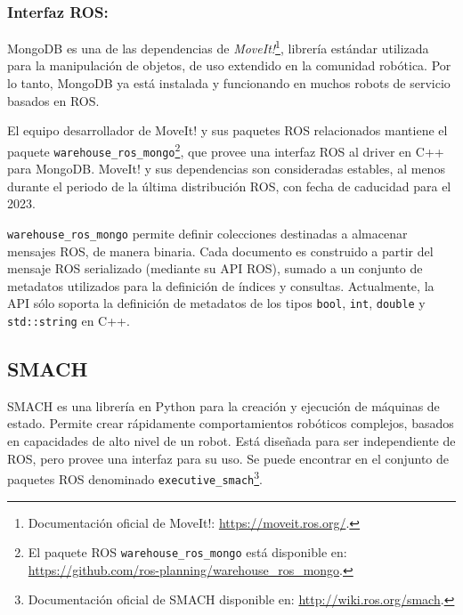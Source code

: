 \subsubsection{Interfaz ROS:}

MongoDB es una de las dependencias de \textit{MoveIt!}\footnote{Documentación oficial de MoveIt!: \url{https://moveit.ros.org/}.}, librería estándar utilizada para la manipulación de objetos, de uso extendido en la comunidad robótica. Por lo tanto, MongoDB ya está instalada y funcionando en muchos robots de servicio basados en ROS. 

El equipo desarrollador de MoveIt! y sus paquetes ROS relacionados mantiene el paquete \texttt{warehouse\_ros\_mongo}\footnote{El paquete ROS \texttt{warehouse\_ros\_mongo} está disponible en: \url{https://github.com/ros-planning/warehouse\_ros\_mongo}.}, que provee una interfaz ROS al driver en C++ para MongoDB. MoveIt! y sus dependencias son consideradas estables, al menos durante el periodo de la última distribución ROS, con fecha de caducidad para el 2023.

\texttt{warehouse\_ros\_mongo} permite definir colecciones destinadas a almacenar mensajes ROS, de manera binaria. Cada documento es construido a partir del mensaje ROS serializado (mediante su API ROS), sumado a un conjunto de metadatos utilizados para la definición de índices y consultas. Actualmente, la API sólo soporta la definición de metadatos de los tipos \texttt{bool}, \texttt{int}, \texttt{double} y \texttt{std::string} en C++.


\subsection{SMACH}

SMACH es una librería en Python para la creación y ejecución de máquinas de estado. Permite crear rápidamente comportamientos robóticos complejos, basados en capacidades de alto nivel de un robot. Está diseñada para ser independiente de ROS, pero provee una interfaz para su uso. Se puede encontrar en el conjunto de paquetes ROS denominado \texttt{executive\_smach}\footnote{Documentación oficial de SMACH disponible en: \url{http://wiki.ros.org/smach}.}.


